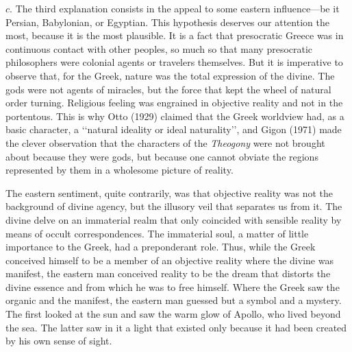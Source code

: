 \documentclass[a4paper]{article}
\begin{document}
$ c. $ The third explanation consists in the appeal to some eastern
influence---be it Persian, Babylonian, or Egyptian. This hypothesis deserves our
attention the most, because it is the most plausible. It is a fact that
presocratic Greece was in continuous contact with other peoples, so much so that
many presocratic philosophers were colonial agents or travelers themselves.
But it is imperative to observe that, for the Greek, nature was the total
expression of the divine. The gods were not agents of miracles, but the force
that kept the wheel of natural order turning. Religious feeling was engrained in
objective reality and not in the portentous. This is why Otto (1929) claimed
that the Greek worldview had, as a basic character, a \lq\lq natural ideality or
ideal naturality\rq\rq{}, and Gigon (1971) made the clever observation that the
characters of the \textit{Theogony} were not brought about because they were
gods, but because one cannot obviate the regions represented by them in a
wholesome picture of reality.

The eastern sentiment, quite contrarily, was that objective reality was not the
background of divine agency, but the illusory veil that separates us from it.
The divine delve on an immaterial realm that only coincided with sensible
reality by means of occult correspondences. The immaterial soul, a matter of
little importance to the Greek, had a preponderant role. Thus, while the Greek
conceived himself to be a member of an objective reality where the divine was
manifest, the eastern man conceived reality to be the dream that
distorts the divine essence and from which he was to free himself. Where the
Greek saw the organic and the manifest, the eastern man guessed but a symbol and a
mystery. The first looked at the sun and saw the warm glow of Apollo, who lived
beyond the sea. The latter saw in it a light that existed only because it had
been created by his own sense of sight.
\end{document}

